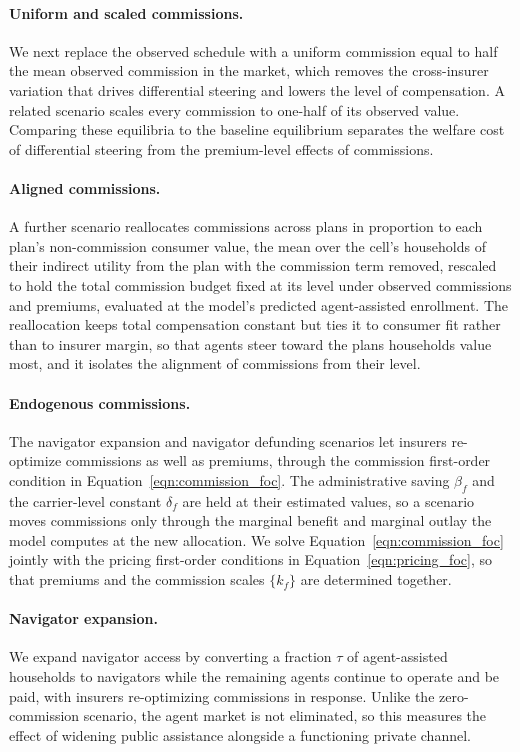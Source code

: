 \documentclass[12pt]{article}
\begin{document}
\paragraph{Uniform and scaled commissions.} We next replace the observed schedule with a uniform commission equal to half the mean observed commission in the market, which removes the cross-insurer variation that drives differential steering and lowers the level of compensation. A related scenario scales every commission to one-half of its observed value. Comparing these equilibria to the baseline equilibrium separates the welfare cost of differential steering from the premium-level effects of commissions.

\paragraph{Aligned commissions.} A further scenario reallocates commissions across plans in proportion to each plan's non-commission consumer value, the mean over the cell's households of their indirect utility from the plan with the commission term removed, rescaled to hold the total commission budget fixed at its level under observed commissions and premiums, evaluated at the model's predicted agent-assisted enrollment. The reallocation keeps total compensation constant but ties it to consumer fit rather than to insurer margin, so that agents steer toward the plans households value most, and it isolates the alignment of commissions from their level.

\paragraph{Endogenous commissions.} The navigator expansion and navigator defunding scenarios let insurers re-optimize commissions as well as premiums, through the commission first-order condition in Equation~\eqref{eqn:commission_foc}. The administrative saving $\beta_f$ and the carrier-level constant $\delta_f$ are held at their estimated values, so a scenario moves commissions only through the marginal benefit and marginal outlay the model computes at the new allocation. We solve Equation~\eqref{eqn:commission_foc} jointly with the pricing first-order conditions in Equation~\eqref{eqn:pricing_foc}, so that premiums and the commission scales $\{k_f\}$ are determined together.

\paragraph{Navigator expansion.} We expand navigator access by converting a fraction $\tau$ of agent-assisted households to navigators while the remaining agents continue to operate and be paid, with insurers re-optimizing commissions in response. Unlike the zero-commission scenario, the agent market is not eliminated, so this measures the effect of widening public assistance alongside a functioning private channel.
\end{document}
